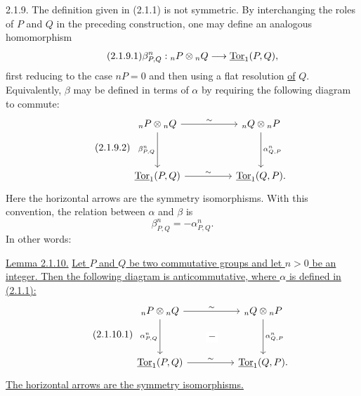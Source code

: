 
2.1.9. The definition given in (2.1.1) is not symmetric.  By
interchanging the roles of $P$ and $Q$ in the preceding construction,
one may define an analogous homomorphism
\begin{equation}\tag{2.1.9.1}
 \beta^n_{P,Q}:{}_nP\otimes{}_nQ\longrightarrow\uTor_1(P,Q),
\end{equation}
first reducing to the case $nP=0$ and then using a flat resolution
\underline{of} $Q$.  Equivalently, $\beta$ may be defined in terms of
$\alpha$ by requiring the following diagram to commute:
\begin{equation}\tag{2.1.9.2}
\begin{tikzcd}[column sep=huge,row sep=huge]
 {}_nP\otimes{}_nQ
   \arrow[r,"\sim"]
   \arrow[d,"{\beta^n_{P,Q}}"']&
 {}_nQ\otimes{}_nP
   \arrow[d,"{\alpha^n_{Q,P}}"]\\
 \uTor_1(P,Q)\arrow[r,"\sim"]&
 \uTor_1(Q,P).
\end{tikzcd}
\end{equation}
Here the horizontal arrows are the symmetry isomorphisms.  With this
convention, the relation between $\alpha$ and $\beta$ is
\begin{equation}\tag{2.1.9.3}
 \beta^n_{P,Q}=-\alpha^n_{P,Q}.
\end{equation}
In other words:

\medskip
\noindent\underline{Lemma 2.1.10.}
\underline{Let $P$ and $Q$ be two commutative groups and let $n>0$ be
an integer.  Then the following diagram is anticommutative, where
$\alpha$ is defined in (2.1.1):}
\begin{equation}\tag{2.1.10.1}
\begin{tikzcd}[column sep=huge,row sep=huge]
 {}_nP\otimes{}_nQ
   \arrow[r,"\sim"]
   \arrow[d,"{\alpha^n_{P,Q}}"']&
 {}_nQ\otimes{}_nP
   \arrow[d,"{\alpha^n_{Q,P}}"]\\
 \uTor_1(P,Q)
   \arrow[r,"\sim"]
   \arrow[ur,phantom,"-" description]&
 \uTor_1(Q,P).
\end{tikzcd}
\end{equation}
\underline{The horizontal arrows are the symmetry isomorphisms.}

